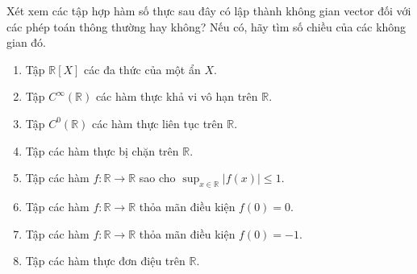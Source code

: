 \documentclass[class=linear-algebra,crop=false]{standalone}
\begin{document}
\begin{exercise}Xét xem các tập hợp hàm số thực sau đây có lập thành không gian vector đối với các phép toán thông thường hay không? Nếu có, hãy tìm số chiều của các không gian đó.
    \begin{enumerate}[label*= (\alph*),itemsep=0pt]
        \item Tập $\mathbb{R}[X]$ các đa thức của một ẩn $X$.
        \item Tập $C^{\infty}(\mathbb{R})$ các hàm thực khả vi vô hạn trên $\mathbb{R}$.
        \item Tập $C^{0}(\mathbb{R})$ các hàm thực liên tục trên $\mathbb{R}$.
        \item Tập các hàm thực bị chặn trên $\mathbb{R}$.
        \item Tập các hàm $f: \mathbb{R}\rightarrow\mathbb{R}$ sao cho $\sup_{x\in\mathbb{R}}|f(x)| \le 1$.
        \item Tập các hàm $f: \mathbb{R}\rightarrow\mathbb{R}$ thỏa mãn điều kiện $f(0) = 0$.
        \item Tập các hàm $f: \mathbb{R}\rightarrow\mathbb{R}$ thỏa mãn điều kiện $f(0) = -1$.
        \item Tập các hàm thực đơn điệu trên $\mathbb{R}$.
    \end{enumerate}
\end{exercise}
\end{document}
